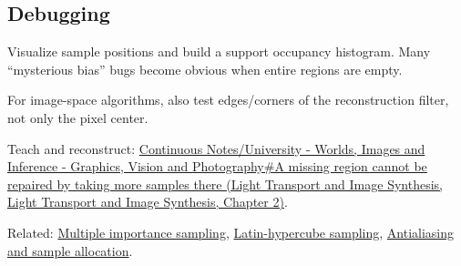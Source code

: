 \subsection{Debugging}\label{appendix-10308c3d753e-debugging}

Visualize sample positions and build a support occupancy histogram. Many ``mysterious bias'' bugs become obvious when entire regions are empty.

For image-space algorithms, also test edges/corners of the reconstruction filter, not only the pixel center.

Teach and reconstruct: \href{../04-Light-Transport-and-Image-Synthesis/main.pdf\#nameddest=03-visual-computing-i-ch007-a-missing-region-cannot-be-repaired-by-taking-more-samples-there}{Continuous Notes/University - Worlds, Images and Inference - Graphics, Vision and Photography\#A missing region cannot be repaired by taking more samples there (Light Transport and Image Synthesis, Light Transport and Image Synthesis, Chapter 2)}.

Related: \hyperref[appendix-ca8898faf1a6]{Multiple importance sampling}, \hyperref[appendix-1c5e85693a06]{Latin-hypercube sampling}, \hyperref[appendix-4192b2bdd21e]{Antialiasing and sample allocation}.
